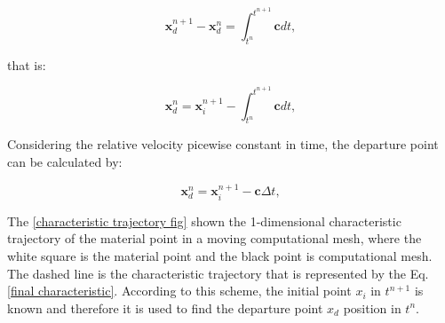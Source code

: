 \begin{equation} 
\textbf{x}_{d}^{n+1} - \textbf{x}_{d}^{n} 
= \int_{t^{n}}^{t^{n+1}} \textbf{c} dt, 
\end{equation}

\medskip
\noindent
that is:

\begin{equation} 
\textbf{x}_{d}^{n} = \textbf{x}_{i}^{n+1} 
- \int_{t^{n}}^{t^{n+1}} \textbf{c}  dt, 
\end{equation}


\medskip
\noindent
Considering the relative velocity picewise constant in time,
the departure point can be calculated by:

\begin{equation} \label{final characteristic}
\textbf{x}_{d}^{n} = \textbf{x}_{i}^{n+1} 
- \textbf{c} \Delta t, 
\end{equation}

\medskip
The \ref{characteristic trajectory fig} shown 
the 1-dimensional characteristic trajectory of
the material point in a moving computational mesh,
where the white square is the material point and
the black point is computational mesh.
The dashed line is the characteristic trajectory
that is represented by the Eq. \ref{final characteristic}.
According to this scheme, the initial point $x_i$ in $t^{n+1}$ is known
and therefore it is used to find 
the departure point $x_d$ position in $t^{n}$.


